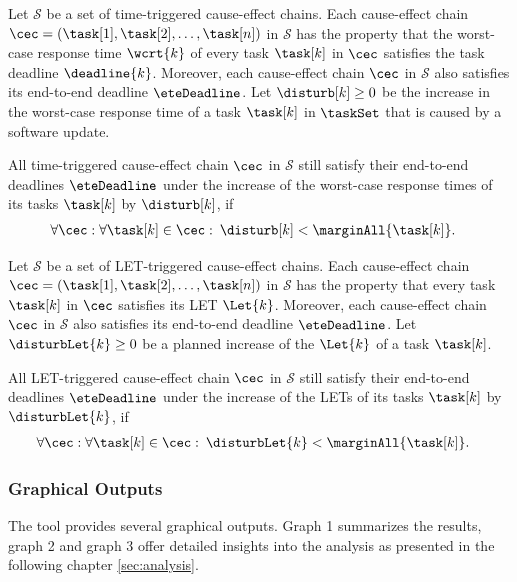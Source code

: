 \begin{tcolorbox}[colback=black!5!white,colframe=black!75!black, breakable, 
title= \textbf{Theorem} (Robustness test for time-triggered cause-effect chains)]
Let $\mathcal{S}$ be a set of time-triggered cause-effect chains. 
Each cause-effect chain $\cec = (\task[1], \task[2], \ldots, \task[n])$ in $\mathcal{S}$ has the property that the worst-case response time $\wcrt{k}$ of every task $\task[k]$ in $\cec$ satisfies the task deadline $\deadline{k}$. 
Moreover, each cause-effect chain $\cec$ in $\mathcal{S}$ also satisfies its end-to-end deadline $\eteDeadline$.
%
Let $\disturb[k] \geq 0$ be the increase in the worst-case response time of a task $\task[k]$ in $\taskSet$ that is caused by a software update.
\smallskip

All time-triggered cause-effect chain $\cec$ in $\mathcal{S}$ still satisfy their end-to-end deadlines $\eteDeadline$ under the increase of the worst-case response times of its tasks $\task[k]$ by $\disturb[k]$, if  
\begin{align*}
	& \forall \cec: \forall \task[k] \in \cec: \:
	\disturb[k] < \marginAll{\task[k]}. 
\end{align*}	
\end{tcolorbox}
\bigskip

\begin{tcolorbox}[colback=black!5!white,colframe=black!75!black, breakable, 
title= \textbf{Theorem} (Robustness test for LET-triggered cause-effect chains)]
Let $\mathcal{S}$ be a set of LET-triggered cause-effect chains. 
Each cause-effect chain $\cec = (\task[1], \task[2], \ldots, \task[n])$ in $\mathcal{S}$ has the property that every task $\task[k]$ in $\cec$ satisfies its LET $\Let{k}$. 
Moreover, each cause-effect chain $\cec$ in $\mathcal{S}$ also satisfies its end-to-end deadline $\eteDeadline$.
%
Let $\disturbLet{k} \geq 0$ be a planned increase of the $\Let{k}$ of a task $\task[k]$.
\smallskip

All LET-triggered cause-effect chain $\cec$ in $\mathcal{S}$ still satisfy their end-to-end deadlines $\eteDeadline$ under the increase of the LETs of its tasks $\task[k]$ by $\disturbLet{k}$, if  
\begin{align*}
	& \forall \cec: \forall \task[k] \in \cec: \:
	\disturbLet{k} < \marginAll{\task[k]}. 
\end{align*}	
\end{tcolorbox}


\subsubsection{Graphical Outputs}
The tool \Tool provides several graphical outputs.
Graph 1 summarizes the results, 
graph 2 and graph 3 offer detailed insights into the analysis as presented in the following chapter \ref{sec:analysis}.
%

